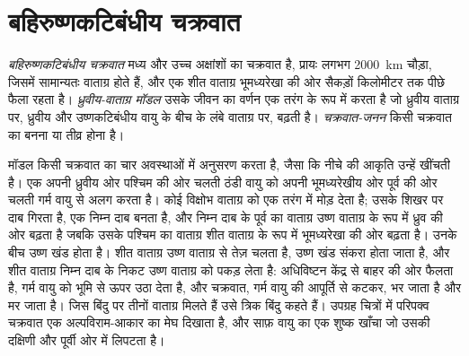 \section{बहिरुष्णकटिबंधीय चक्रवात}\label{sec:b2:weather-systems:cyclones}

\begin{definition}\label{def:b2:weather-systems:cyclones}
\emph{बहिरुष्णकटिबंधीय चक्रवात} मध्य और उच्च अक्षांशों का चक्रवात है,
प्रायः लगभग \qty{2000}{km} चौड़ा, जिसमें सामान्यतः वाताग्र होते हैं, और एक शीत वाताग्र भूमध्यरेखा की ओर
सैकड़ों किलोमीटर तक पीछे फैला रहता है। \emph{ध्रुवीय-वाताग्र मॉडल}
उसके जीवन का वर्णन एक तरंग के रूप में करता है जो ध्रुवीय वाताग्र पर, ध्रुवीय और उष्णकटिबंधीय वायु के बीच
के लंबे वाताग्र पर, बढ़ती है। \emph{चक्रवात-जनन} किसी चक्रवात का बनना या
तीव्र होना है।
\end{definition}

मॉडल किसी चक्रवात का चार अवस्थाओं में अनुसरण करता है, जैसा कि नीचे की आकृति उन्हें खींचती है। एक  अपनी ध्रुवीय ओर पश्चिम की ओर चलती ठंडी वायु को अपनी भूमध्यरेखीय ओर पूर्व की ओर चलती गर्म वायु से
अलग करता है। कोई विक्षोभ वाताग्र को एक तरंग में मोड़ देता है; उसके शिखर पर दाब गिरता है, एक
निम्न दाब बनता है, और निम्न दाब के पूर्व का वाताग्र उष्ण वाताग्र के रूप में ध्रुव की ओर बढ़ता है जबकि उसके
पश्चिम का वाताग्र शीत वाताग्र के रूप में भूमध्यरेखा की ओर बढ़ता है। उनके बीच उष्ण खंड होता है। शीत वाताग्र
उष्ण वाताग्र से तेज़ चलता है, उष्ण खंड संकरा होता जाता है, और शीत वाताग्र निम्न दाब के निकट उष्ण वाताग्र को
पकड़ लेता है: अधिविष्टन केंद्र से बाहर की ओर फैलता है, गर्म वायु को भूमि से ऊपर उठा देता है, और चक्रवात,
गर्म वायु की आपूर्ति से कटकर, भर जाता है और मर जाता है। जिस बिंदु पर
तीनों वाताग्र मिलते हैं उसे त्रिक बिंदु कहते हैं। उपग्रह चित्रों में परिपक्व चक्रवात एक अल्पविराम-आकार का
मेघ दिखाता है, और साफ़ वायु का एक शुष्क खाँचा जो उसकी दक्षिणी और पूर्वी ओर में लिपटता है।

